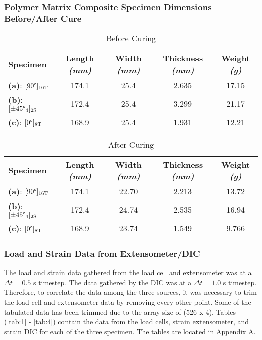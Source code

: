 \subsubsection{Polymer Matrix Composite Specimen Dimensions Before/After Cure}
\begin{table}[!h]
    \centering
    \caption{Before Curing}
    \begin{tabular}{|l||c|c|c|c|}\toprule
        Specimen & Length \textit{(mm)} & Width \textit{(mm)} & Thickness \textit{(mm)} & Weight \textit{(g)} \\ \midrule
        \textbf{(a)}: $[90\degree]_{16\text{T}}$ & 174.1 & 25.4 & 2.635 & 17.15 \\\hline
        \textbf{(b)}: $[\pm45\degree_4]_{2\text{S}}$ & 172.4 & 25.4 & 3.299 & 21.17 \\\hline
        \textbf{(c)}: $[0\degree]_{8\text{T}}$ & 168.9 & 25.4 & 1.931 & 12.21 \\\bottomrule
    \end{tabular}
    \label{tab:beforedimensions}
\end{table}
\begin{table}[!h]
    \centering
    \caption{After Curing}
    \begin{tabular}{|l||c|c|c|c|}\toprule
        Specimen & Length \textit{(mm)} & Width \textit{(mm)} & Thickness \textit{(mm)} & Weight \textit{(g)} \\ \midrule
        \textbf{(a)}: $[90\degree]_{16\text{T}}$ & 174.1 & 22.70 & 2.213 & 13.72 \\\hline
        \textbf{(b)}: $[\pm45\degree_4]_{2\text{S}}$ & 172.4 & 24.74 & 2.535 & 16.94 \\\hline
        \textbf{(c)}: $[0\degree]_{8\text{T}}$ & 168.9 & 23.74 & 1.549 & 9.766 \\\bottomrule
    \end{tabular}
    \label{tab:afterdimensions}
\end{table}

\subsubsection{Load and Strain Data from Extensometer/DIC}
The load and strain data gathered from the load cell and extensometer was at a $\Delta t = 0.5$ s timestep.  The data gathered by the DIC was at a $\Delta t = 1.0$ s timestep.  Therefore, to correlate the data among the three sources, it was necessary to trim the load cell and extensometer data by removing every other point.  Some of the tabulated data has been trimmed due to the array size of (526 x 4).  Tables (\ref{tab:1} - \ref{tab:4}) contain the data from the load cells, strain extensometer, and strain DIC for each of the three specimen.  The tables are located in Appendix A.


